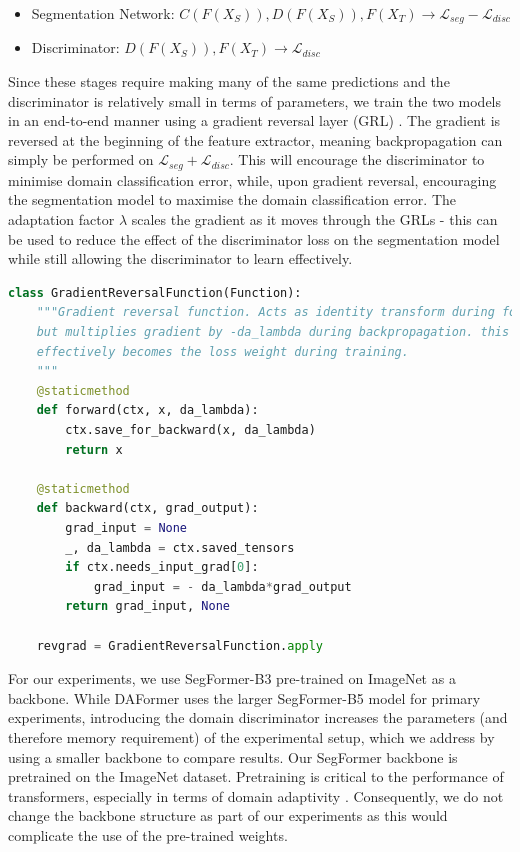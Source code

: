 \documentclass[a4paper,12pt]{report}
\begin{document}
\begin{itemize}
    \item Segmentation Network: $C(F(X_S)), D(F(X_S)), F(X_T) \rightarrow \mathcal{L}_{seg} - \mathcal{L}_{disc} $
    \item Discriminator: $D(F(X_S)), F(X_T) \rightarrow \mathcal{L}_{disc}$
\end{itemize}

Since these stages require making many of the same predictions and the discriminator is relatively small in terms of parameters, we train the two models in an end-to-end manner using a gradient reversal layer (GRL) \cite{ganin_domain-adversarial_2016}. The gradient is reversed at the beginning of the feature extractor, meaning backpropagation can simply be performed on $\mathcal{L}_{seg} + \mathcal{L}_{disc}$. This will encourage the discriminator to minimise domain classification error, while, upon gradient reversal, encouraging the segmentation model to maximise the domain classification error. The adaptation factor $\lambda$ scales the gradient as it moves through the GRLs - this can be used to reduce the effect of the discriminator loss on the segmentation model while still allowing the discriminator to learn effectively.

\hspace*{4mm}
\begin{lstlisting}[language=Python, caption=Gradient reversal function implemented in PyTorch. Based on \url{https://github.com/tadeephuy/GradientReversal}]
class GradientReversalFunction(Function):
    """Gradient reversal function. Acts as identity transform during forward pass, 
    but multiplies gradient by -da_lambda during backpropagation. this means da_lambda 
    effectively becomes the loss weight during training.
    """
    @staticmethod
    def forward(ctx, x, da_lambda):
        ctx.save_for_backward(x, da_lambda)
        return x
    
    @staticmethod
    def backward(ctx, grad_output):
        grad_input = None
        _, da_lambda = ctx.saved_tensors
        if ctx.needs_input_grad[0]:
            grad_input = - da_lambda*grad_output
        return grad_input, None

    revgrad = GradientReversalFunction.apply
\end{lstlisting}

For our experiments, we use SegFormer-B3 \cite{xie_segformer_2021} pre-trained on ImageNet as a backbone. While DAFormer uses the larger SegFormer-B5 model for primary experiments, introducing the domain discriminator increases the parameters (and therefore memory requirement) of the experimental setup, which we address by using a smaller backbone to compare results. Our SegFormer backbone is pretrained on the ImageNet dataset. Pretraining is critical to the performance of transformers, especially in terms of domain adaptivity \cite{dosovitskiy_image_2021}. Consequently, we do not change the backbone structure as part of our experiments as this would complicate the use of the pre-trained weights.
\end{document}
